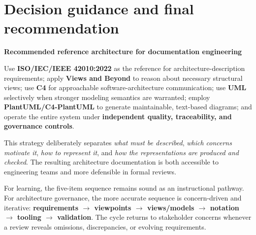 \documentclass[11pt,letterpaper,oneside]{article}
\newcommand{\term}[1]{\textbf{\color{Navy}#1}}
\begin{document}
\section{Decision guidance and final recommendation}\label{sec:recommend}
\begin{keybox}
\textbf{Recommended reference architecture for documentation engineering}\par
Use \term{ISO/IEC/IEEE 42010:2022} as the reference for architecture-description requirements; apply \term{Views and Beyond} to reason about necessary structural views; use \term{C4} for approachable software-architecture communication; use \term{UML} selectively when stronger modeling semantics are warranted; employ \term{PlantUML/C4-PlantUML} to generate maintainable, text-based diagrams; and operate the entire system under \term{independent quality, traceability, and governance controls}.
\end{keybox}

This strategy deliberately separates \emph{what must be described}, \emph{which concerns motivate it}, \emph{how to represent it}, and \emph{how the representations are produced and checked}. The resulting architecture documentation is both accessible to engineering teams and more defensible in formal reviews.

For learning, the five-item sequence remains sound as an instructional pathway. For architecture governance, the more accurate sequence is concern-driven and iterative: \textbf{requirements $\rightarrow$ viewpoints $\rightarrow$ views/models $\rightarrow$ notation $\rightarrow$ tooling $\rightarrow$ validation}. The cycle returns to stakeholder concerns whenever a review reveals omissions, discrepancies, or evolving requirements.
\end{document}
